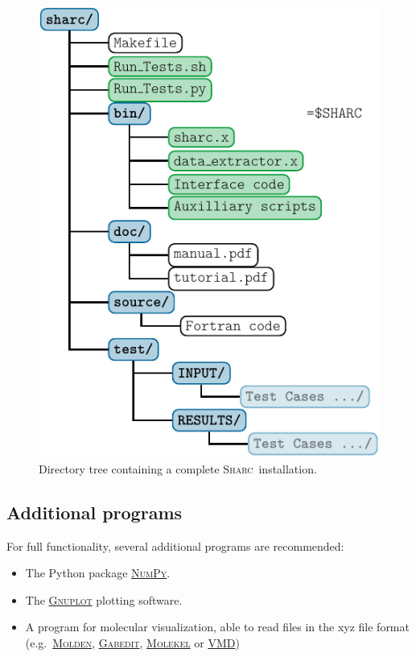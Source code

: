 \documentclass[a4paper,11pt,DIV=15,openany,twoside=false]{scrbook}
\newcommand{\sharc}{\textsc{Sharc}}
\begin{document}
\begin{figure}[h!]
  \centering
  \includegraphics[scale=1]{img/dirs_SHARC/dirs_SHARC.pdf}
  \caption{Directory tree containing a complete \sharc\ installation.}
  \label{fig:installation}
\end{figure}

\subsection{Additional programs}

For full functionality, several additional programs are recommended:
\begin{itemize}
  \item The Python package \href{http://www.numpy.org/}{\textsc{NumPy}}.
  \item The \href{http://www.gnuplot.info/}{\textsc{Gnuplot}} plotting software.
  \item A program for molecular visualization, able to read files in the xyz file format (e.g.\ \href{http://www.cmbi.ru.nl/molden/molden.html}{\textsc{Molden}}, \href{http://gabedit.sourceforge.net/}{\textsc{Gabedit}}, \href{http://molekel.cscs.ch/wiki/pmwiki.php}{\textsc{Molekel}} or \href{http://www.ks.uiuc.edu/Research/vmd/}{VMD})
\end{itemize}
\end{document}

